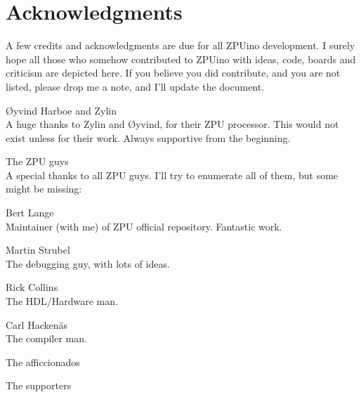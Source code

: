 \chapter{Acknowledgments}

A few credits and acknowledgments are due for all ZPUino development. I surely hope
all those who somehow contributed to ZPUino with ideas, code, boards and criticism
are depicted here. If you believe you did contribute, and you are not listed, please
drop me a note, and I'll update the document.

\begin{description}
\item{\O yvind Harboe and Zylin} \hfill \\
A huge thanks to Zylin and \O yvind, for their ZPU processor. This would not exist unless for their
work. Always supportive from the beginning. 

\item{The ZPU guys} \hfill \\
A special thanks to all ZPU guys. I'll try to enumerate all of them, but some might be missing:
\begin{description}
\item{Bert Lange} \hfill \\ Maintainer (with me) of ZPU official repository. Fantastic work.
\item{Martin Strubel} \hfill \\ The debugging guy, with lots of ideas.
\item{Rick Collins} \hfill \\ The HDL/Hardware man. 
\item{Carl Hacken\"as} \hfill \\ The compiler man. 
\end{description}

\item{The afficcionados}
\item{The supporters}


\end{description}

